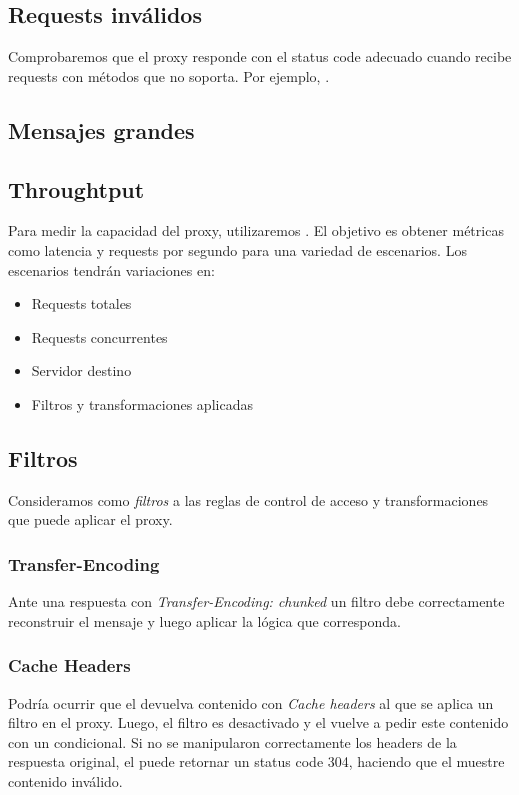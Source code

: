 \documentclass[11pt,a4paper,titlepage]{article}
\begin{document}
\subsection{Requests inválidos}
Comprobaremos que el proxy responde con el status code adecuado cuando recibe requests con métodos que no soporta.
Por ejemplo, .

\subsection{Mensajes grandes}

\subsection{Throughtput}
Para medir la capacidad del proxy, utilizaremos .
El objetivo es obtener métricas como latencia y requests por segundo para una variedad de escenarios.
Los escenarios tendrán variaciones en: 
\begin{itemize}
    \item Requests totales
    \item Requests concurrentes
    \item Servidor destino
    \item Filtros y transformaciones aplicadas
\end{itemize}

\subsection{Filtros}
Consideramos como \textit{filtros} a las reglas de control de acceso y transformaciones que puede aplicar el proxy.

\subsubsection{Transfer-Encoding}
Ante una respuesta con \textit{Transfer-Encoding: chunked} un filtro debe correctamente reconstruir el mensaje y luego aplicar la lógica que corresponda.

\subsubsection{Cache Headers}
Podría ocurrir que el \os devuelva contenido con \textit{Cache headers} al que se aplica un filtro en el proxy.
Luego, el filtro es desactivado y el \ua vuelve a pedir este contenido con un  condicional.
Si no se manipularon correctamente los headers de la respuesta original, el \os puede retornar un status code 304, haciendo que el \ua muestre contenido inválido.
\end{document}
